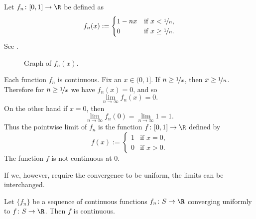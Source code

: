 \documentclass[12pt]{book}
\begin{document}
\begin{example}
Let $f_n \colon [0,1] \to \R$
be defined as
\begin{equation*}
f_n(x) :=
\begin{cases}
1-nx &  \text{if $x < \nicefrac{1}{n}$,}\\
0 &  \text{if $x \geq \nicefrac{1}{n}$.}
\end{cases}
\end{equation*}
See .

\begin{figure}[h!t]
\begin{center}

\caption{Graph of $f_n(x)$.%
\label{contconvcntr:fig}}
\end{center}
\end{figure}

Each function $f_n$ is continuous.
Fix an $x \in (0,1]$.
If $n \geq \nicefrac{1}{x}$,
then $x \geq \nicefrac{1}{n}$.
Therefore for $n \geq \nicefrac{1}{x}$
we have $f_n(x) = 0$, and so
\begin{equation*}
\lim_{n \to \infty} f_n(x) = 0.
\end{equation*}
On the other hand if $x=0$, then
\begin{equation*}
\lim_{n \to \infty} f_n(0) = 
\lim_{n \to \infty} 1 = 1.
\end{equation*}
Thus the pointwise limit of $f_n$ is the function
$f \colon [0,1] \to \R$ defined by
\begin{equation*}
f(x) :=
\begin{cases}
1 &  \text{if $x = 0$,}\\
0 &  \text{if $x > 0$.}
\end{cases}
\end{equation*}
The function $f$ is not continuous at 0.
\end{example}

If we, however, require the convergence to be uniform, the limits can
be interchanged.

\begin{thm}
Let $\{ f_n \}$ be 
a sequence of continuous functions $f_n \colon S \to \R$ converging
uniformly to  $f \colon S \to \R$.
Then $f$ is continuous.
\end{thm}
\end{document}
